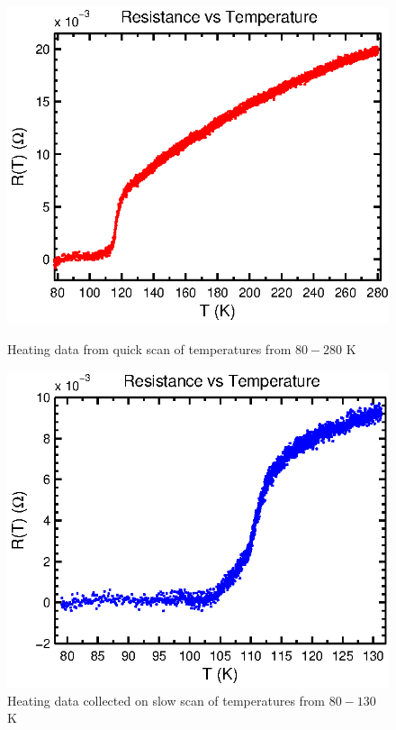 \documentclass[paper=a4, fontsize=11pt]{scrartcl}
\numberwithin{equation}{section}
\numberwithin{figure}{section}
\numberwithin{table}{section}
\begin{document}
      \begin{figure}[h]
      \begin{minipage}[b]{0.48\linewidth}
      \begin{center}
            \includegraphics[width=\textwidth]{Figures/fastHeat2.eps}
            \caption{Heating data from quick scan of temperatures from $80 - 280$ K}
            \label{fig:fastHeat}
      \end{center}
      \end{minipage}
      \hspace{0.5cm}
      \begin{minipage}[b]{0.48\linewidth}
      \begin{center}
            \includegraphics[width=\textwidth]{Figures/slowHeat2.eps}
            \caption{Heating data collected on slow scan of temperatures from $80 - 130$ K}
            \label{fig:slowHeat}
      \end{center}
      \end{minipage}
\end{figure}
\end{document}
